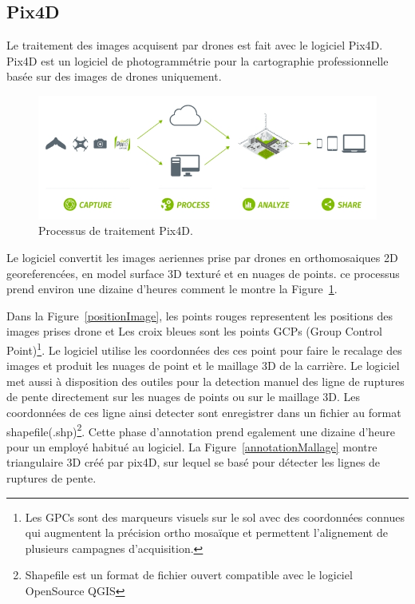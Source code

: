 \subsection{Pix4D}

Le traitement des images acquisent par drones est fait avec le logiciel Pix4D.
Pix4D est un logiciel de photogrammétrie pour la cartographie professionnelle 
basée sur des images de drones uniquement. 
\begin{figure}[h]
  \begin{center}
    \includegraphics[width=12cm]{images/processusPix4D.jpg}
     \caption{Processus de traitement Pix4D.
     \label{ProcesPix4D}}
  \end{center}
\end{figure}
Le logiciel convertit les images 
aeriennes prise par drones en orthomosaiques 2D georeferencées, en model 
surface 3D texturé et en nuages de points. ce processus prend environ une dizaine
d'heures comment le montre la Figure~\ref{ProcesPix4D}. 

Dans la Figure~\ref{positionImage}, les points rouges representent les positions
des images prises drone et Les croix bleues sont les points GCPs
(Group Control Point)\footnote{Les GPCs sont des 
marqueurs visuels sur le sol avec des coordonnées connues qui augmentent 
la précision ortho mosaïque et permettent l'alignement de plusieurs 
campagnes d’acquisition.}. Le logiciel utilise les coordonnées des ces point
pour faire le recalage des images et produit les nuages de point et le maillage 3D
de la carrière. Le logiciel met aussi à disposition des outiles pour la detection
manuel des ligne de ruptures de pente directement sur les nuages de points ou
sur le maillage 3D. Les coordonnées de ces ligne ainsi detecter sont enregistrer
dans un fichier au format shapefile(.shp)\footnote{Shapefile est un format
de fichier ouvert compatible avec le logiciel OpenSource QGIS}. Cette phase
d'annotation prend egalement une dizaine d'heure pour un employé habitué au logiciel.
La Figure~\ref{annotationMallage} montre triangulaire 3D créé par pix4D,
sur lequel se basé pour détecter les lignes de ruptures de pente.

